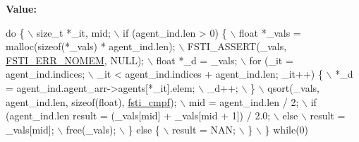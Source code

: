 {\bfseries Value\+:}
\begin{DoxyCode}
\textcolor{keywordflow}{do} \{                       \(\backslash\)
        size\_t *\_it, mid;                                               \(\backslash\)
        if (agent\_ind.len > 0) \{                                        \(\backslash\)
            float *\_vals = malloc(\textcolor{keyword}{sizeof}(*\_vals) * agent\_ind.len);      \(\backslash\)
            FSTI\_ASSERT(\_vals, \mbox{\hyperlink{fsti-error_8h_a385c44f6fb256e5716a2302a5b940388a06189e86eed4d9c1d3b1f69cfb58a41e}{FSTI\_ERR\_NOMEM}}, NULL);                   \(\backslash\)
            float *\_d = \_vals;                                          \(\backslash\)
            for (\_it = agent\_ind.indices;                               \(\backslash\)
                 \_it < agent\_ind.indices + agent\_ind.len; \_it++)  \{     \(\backslash\)
                *\_d = agent\_ind.agent\_arr->agents[*\_it].elem;           \(\backslash\)
                \_d++;                                                   \(\backslash\)
            \}                                                           \(\backslash\)
            qsort(\_vals, agent\_ind.len, \textcolor{keyword}{sizeof}(\textcolor{keywordtype}{float}), \mbox{\hyperlink{fsti-report_8h_a01f88429a83ea714459262c661ba9859}{fsti\_cmpf}});      \(\backslash\)
            mid = agent\_ind.len / 2;                                    \(\backslash\)
            if (agent\_ind.len %
                result = (\_vals[mid] + \_vals[mid + 1]) / 2.0;           \(\backslash\)
            else                                                        \(\backslash\)
                result = \_vals[mid];                                    \(\backslash\)
            free(\_vals);                                                \(\backslash\)
        \} \textcolor{keywordflow}{else} \{                                                        \(\backslash\)
            result = NAN;                                               \(\backslash\)
        \}                                                               \(\backslash\)
    \} \textcolor{keywordflow}{while}(0)
\end{DoxyCode}
\mbox{\label{fsti-report_8h_a23a8b3ad8faaf4c4f0f645486e27faeb}} 
